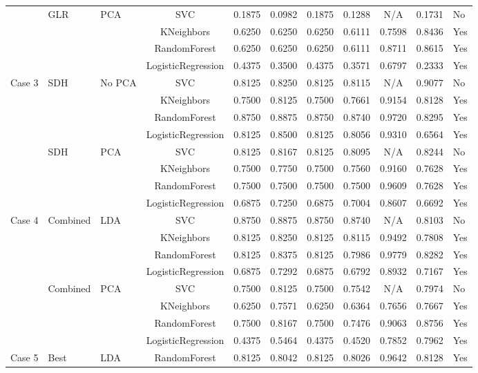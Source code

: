 \documentclass[9pt, journal]{IEEEtran}
\begin{document}
\begin{table*}[ht]
\begin{adjustbox}{width=1\textwidth}
\begin{tabular}{@{}lllcccccccl@{}}
\cmidrule(lr){2-11}
 & \multirow{4}{*}{GLR} & \multirow{4}{*}{PCA} & SVC & 0.1875 & 0.0982 & 0.1875 & 0.1288 & N/A & 0.1731 & No \\
 &  &  & KNeighbors & 0.6250 & 0.6250 & 0.6250 & 0.6111 & 0.7598 & 0.8436 & Yes \\
 &  &  & RandomForest & 0.6250 & 0.6250 & 0.6250 & 0.6111 & 0.8711 & 0.8615 & Yes \\
 &  &  & LogisticRegression & 0.4375 & 0.3500 & 0.4375 & 0.3571 & 0.6797 & 0.2333 & Yes \\
\midrule
\multirow{4}{*}{Case 3} & \multirow{4}{*}{SDH} & \multirow{4}{*}{No PCA} & SVC & 0.8125 & 0.8250 & 0.8125 & 0.8115 & N/A & 0.9077 & No \\
 &  &  & KNeighbors & 0.7500 & 0.8125 & 0.7500 & 0.7661 & 0.9154 & 0.8128 & Yes \\
 &  &  & RandomForest & 0.8750 & 0.8875 & 0.8750 & 0.8740 & 0.9720 & 0.8295 & Yes \\
 &  &  & LogisticRegression & 0.8125 & 0.8500 & 0.8125 & 0.8056 & 0.9310 & 0.6564 & Yes \\
\cmidrule(lr){2-11}
 & \multirow{4}{*}{SDH} & \multirow{4}{*}{PCA} & SVC & 0.8125 & 0.8167 & 0.8125 & 0.8095 & N/A & 0.8244 & No \\
 &  &  & KNeighbors & 0.7500 & 0.7750 & 0.7500 & 0.7560 & 0.9160 & 0.7628 & Yes \\
 &  &  & RandomForest & 0.7500 & 0.7500 & 0.7500 & 0.7500 & 0.9609 & 0.7628 & Yes \\
 &  &  & LogisticRegression & 0.6875 & 0.7250 & 0.6875 & 0.7004 & 0.8607 & 0.6692 & Yes \\
\midrule
\multirow{4}{*}{Case 4} & \multirow{4}{*}{Combined} & \multirow{4}{*}{LDA} & SVC & 0.8750 & 0.8875 & 0.8750 & 0.8740 & N/A & 0.8103 & No \\
 &  &  & KNeighbors & 0.8125 & 0.8250 & 0.8125 & 0.8115 & 0.9492 & 0.7808 & Yes \\
 &  &  & RandomForest & 0.8125 & 0.8375 & 0.8125 & 0.7986 & 0.9779 & 0.8282 & Yes \\
 &  &  & LogisticRegression & 0.6875 & 0.7292 & 0.6875 & 0.6792 & 0.8932 & 0.7167 & Yes \\
\cmidrule(lr){2-11}
 & \multirow{4}{*}{Combined} & \multirow{4}{*}{PCA} & SVC & 0.7500 & 0.8125 & 0.7500 & 0.7542 & N/A & 0.7974 & No \\
 &  &  & KNeighbors & 0.6250 & 0.7571 & 0.6250 & 0.6364 & 0.7656 & 0.7667 & Yes \\
 &  &  & RandomForest & 0.7500 & 0.8167 & 0.7500 & 0.7476 & 0.9063 & 0.8756 & Yes \\
 &  &  & LogisticRegression & 0.4375 & 0.5464 & 0.4375 & 0.4520 & 0.7852 & 0.7962 & Yes \\
\midrule
\multirow{1}{*}{Case 5} & \multirow{1}{*}{Best} & \multirow{1}{*}{LDA} & RandomForest & 0.8125 & 0.8042 & 0.8125 & 0.8026 & 0.9642 & 0.8128 & Yes \\
\bottomrule
\end{tabular}
\end{adjustbox}
\end{table*}
\end{document}
